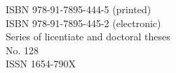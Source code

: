 \documentclass[11pt, twoside, openright]{book}
\theoremstyle{definition}
\newif\ifpaperII %
\begin{document}
\begin{titlepage}
{%
}

\newpage
\thispagestyle{empty}
\begin{flushleft}

ISBN 978-91-7895-444-5 (printed)\\
ISBN 978-91-7895-445-2 (electronic)\\
Series of licentiate and doctoral theses\\
No. 128\\
ISSN 1654-790X\linebreak[2]



\end{flushleft}
\end{titlepage}
\end{document}
